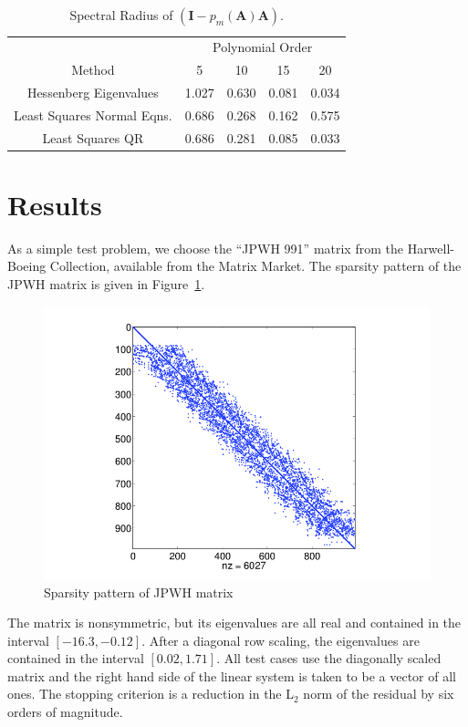\documentclass[10pt]{article}
\newcommand{\bA}{\ensuremath{\mathbf{A}}}
\newcommand{\bI}{\ensuremath{\mathbf{I}}}
\begin{document}
\begin{table}
\centering
\caption{Spectral Radius of $\left( \bI - p_m(\bA) \bA \right)$.}
\label{tab:gmres_poly}
\begin{tabular}{ccccc}
\toprule
& \multicolumn{4}{c}{Polynomial Order} \\
\cmidrule(r){2-5}
Method & 5 & 10 & 15 & 20 \\
\midrule
Hessenberg Eigenvalues     & 1.027 & 0.630 & 0.081 & 0.034 \\
Least Squares Normal Eqns. & 0.686 & 0.268 & 0.162 & 0.575 \\
Least Squares QR           & 0.686 & 0.281 & 0.085 & 0.033 \\
\bottomrule
\end{tabular}
\end{table}

\section{Results}
\label{sec:results}

As a simple test problem, we choose the ``JPWH 991'' matrix from
the Harwell-Boeing Collection, available from the Matrix Market.
The sparsity pattern of the JPWH matrix is given in Figure~\ref{fig:jpwh_sparsity}.
\begin{figure}
\centering
\includegraphics[width=4.5in]{jpwh_sparsity}
\caption{Sparsity pattern of JPWH matrix \label{fig:jpwh_sparsity}}
\end{figure}
The matrix is nonsymmetric, but its eigenvalues are all real and
contained in the interval $[-16.3,-0.12]$.  After a diagonal row
scaling, the eigenvalues are contained in the interval $[0.02,1.71]$.
All test cases use the diagonally scaled matrix and the right
hand side of the linear system is taken to be a vector of all ones.
The stopping criterion is a reduction in the L$_2$ norm of the residual
by six orders of magnitude.
\end{document}
